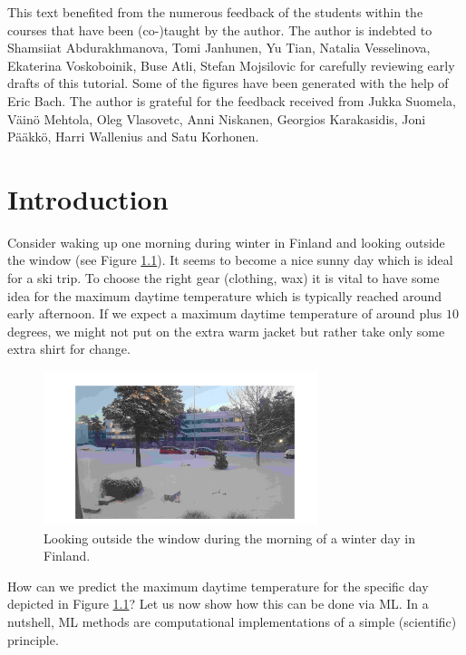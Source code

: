 \documentclass[12pt]{report}
\begin{document}
This text benefited from the numerous feedback of the 
students within the courses that have been (co-)taught 
by the author. The author is indebted to Shamsiiat Abdurakhmanova, 
Tomi Janhunen, Yu Tian, Natalia Vesselinova, Ekaterina Voskoboinik, 
Buse Atli, Stefan Mojsilovic for carefully reviewing early 
drafts of this tutorial. Some of the figures have been 
generated with the help of Eric Bach. The author is grateful 
for the feedback received from Jukka Suomela, V{\"a}in{\"o} Mehtola, 
Oleg Vlasovetc, Anni Niskanen, Georgios Karakasidis, Joni P{\"a}{\"a}kk{\"o}, 
Harri Wallenius and Satu Korhonen. 


\tableofcontents                        %


\chapter{Introduction}
Consider waking up one morning during winter in Finland 
and looking outside the window (see Figure \ref{fig:skiday}). 
It seems to become a nice sunny day which is ideal for a 
ski trip. To choose the right gear (clothing, wax) it is 
vital to have some idea for the maximum daytime temperature 
which is typically reached around early afternoon. If we 
expect a maximum daytime temperature of around plus 
$10$ degrees, we might not put on the extra warm jacket 
but rather take only some extra shirt for change. 


\begin{figure}[htbp]
	\centering
	\includegraphics[width=8cm]{SkiDay2.jpeg}
	\caption{Looking outside the window during the morning of a winter day in Finland.}
	\label{fig:skiday}
\end{figure}

How can we predict the maximum daytime temperature for 
the specific day depicted in Figure \ref{fig:skiday}? Let us now 
show how this can be done via ML. In a nutshell, 
ML methods are computational implementations of a simple 
(scientific) principle. 
\end{document}
